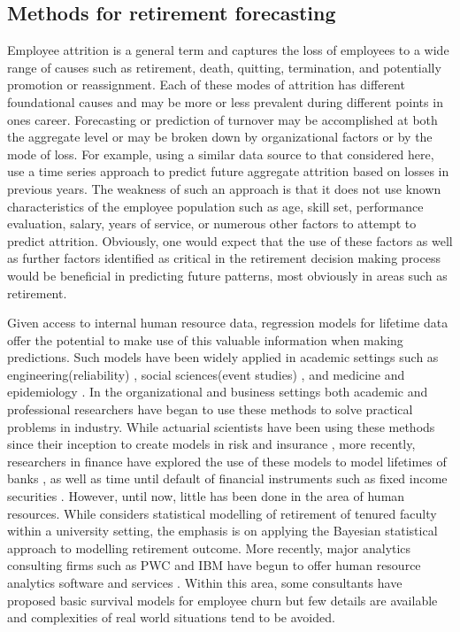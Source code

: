 \documentclass[12pt,letterpaper]{article}
\begin{document}
\subsection{Methods for retirement forecasting}

Employee attrition is a general term and captures the loss of employees to a wide range of causes such as retirement, death, quitting, termination, and potentially promotion or reassignment. Each of these modes of attrition has different foundational causes and may be more or less prevalent during different points in ones career.  Forecasting or prediction of turnover may be accomplished at both the aggregate level or may be broken down by organizational factors or by the mode of loss.  For example, using a similar data source to that considered here, \citet{zhu2015} use a time series approach to predict future aggregate attrition based on losses in previous years.  The weakness of such an approach is that it does not use known characteristics of the employee population such as age, skill set, performance evaluation, salary, years of service, or numerous other factors to attempt to predict attrition.  Obviously, one would expect that the use of these factors as well as further factors identified as critical in the retirement decision making process \citet{Wang2010} would be beneficial in predicting future patterns, most obviously in areas such as retirement.

Given access to internal human resource data, regression models for lifetime data offer the potential to make use of this valuable information when making predictions.  Such models have been widely applied in academic settings such as engineering(reliability) \citep{lawless2011}
, social sciences(event studies) \citep{allison2010,long2006}, and medicine and epidemiology \citep{kalbfleisch2011,Kleinmoeschberger2003}.  In the organizational and business settings both academic and professional researchers have began to use these methods to solve practical problems in industry. While actuarial scientists have been using these methods since their inception to create models in risk and insurance \citep{brockett2008}, more recently, researchers in finance have explored the use of these models to model lifetimes of banks \citep{Lane1986}, as well as time until default of financial instruments such as fixed income securities \citep{leclere2005}.
However, until now, little has been done in the area of human resources.   While \citet{berger1993} considers statistical modelling of retirement of tenured faculty within a university setting, the emphasis is on applying the Bayesian statistical approach to modelling retirement outcome.  More recently, major analytics consulting firms such as PWC and IBM have begun to offer human resource analytics software and services \citep{IBM,PWC}.  Within this area, some consultants have proposed basic survival models for employee churn \citep{briggs2015} but few details are available and complexities of real world situations tend to be avoided.
\end{document}
